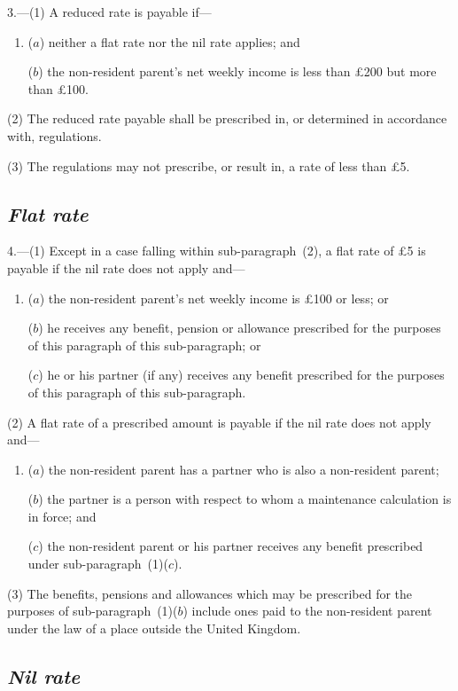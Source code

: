 \documentclass[12pt,a4paper]{article}
\begin{document}
3.---(1) A reduced rate is payable if—
\begin{enumerate}\item[]
($a$) neither a flat rate nor the nil rate applies; and

($b$) the non-resident parent’s net weekly income is less than £200 but more than £100. 
\end{enumerate}

(2) The reduced rate payable shall be prescribed in, or determined in accordance with, regulations.

(3) The regulations may not prescribe, or result in, a rate of less than £5. 

\subsection*{\itshape Flat rate}

4.---(1) Except in a case falling within sub-paragraph~(2), a flat rate of £5 is payable if the nil rate does not apply and—
\begin{enumerate}\item[]
($a$) the non-resident parent’s net weekly income is £100 or less; or

($b$) he receives any benefit, pension or allowance prescribed for the purposes of this paragraph of this sub-paragraph; or

($c$) he or his partner (if any) receives any benefit prescribed for the purposes of this paragraph of this sub-paragraph.
\end{enumerate}

(2) A flat rate of a prescribed amount is payable if the nil rate does not apply and—
\begin{enumerate}\item[]
($a$) the non-resident parent has a partner who is also a non-resident parent;

($b$) the partner is a person with respect to whom a maintenance calculation is in force; and

($c$) the non-resident parent or his partner receives any benefit prescribed under sub-paragraph~(1)($c$).
\end{enumerate}

(3) The benefits, pensions and allowances which may be prescribed for the purposes of sub-paragraph~(1)($b$)  include ones paid to the non-resident parent under the law of a place outside the United Kingdom.

\subsection*{\itshape Nil rate}
\end{document}
